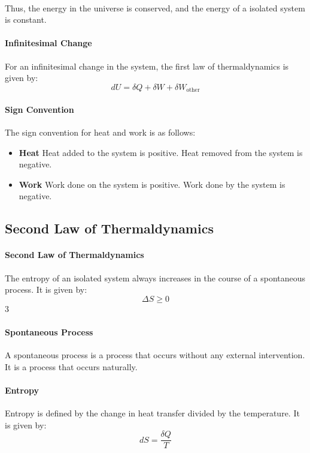 \documentclass[11pt]{report}
\begin{document}
\paragraph{} Thus, the energy in the universe is conserved, and the energy of a isolated system is constant. 
\paragraph{Infinitesimal Change} For an infinitesimal change in the system, the first law of thermaldynamics is given by:
\begin{equation}
    dU = \delta Q + \delta W + \delta W_{\text{other}} 
\end{equation}
\paragraph{Sign Convention} The sign convention for heat and work is as follows:
\begin{itemize}
    \item \textbf{Heat} Heat added to the system is positive. Heat removed from the system is negative.
    \item \textbf{Work} Work done on the system is positive. Work done by the system is negative.
\end{itemize}
\subsection{Second Law of Thermaldynamics}
\paragraph{Second Law of Thermaldynamics} The entropy of an isolated system always increases in the course of a spontaneous process. It is given by:
\begin{equation}
    \Delta S \ge 0
\end{equation}3
\paragraph{Spontaneous Process} A spontaneous process is a process that occurs without any external intervention. It is a process that occurs naturally.
\paragraph{Entropy} Entropy is defined by the change in heat transfer divided by the temperature. It is given by:
\begin{equation}
    dS = \frac{\delta Q}{T}
\end{equation}
\end{document}
